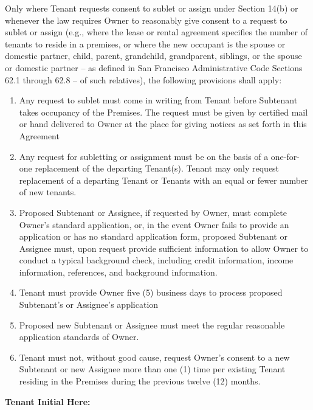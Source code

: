 \documentclass[9pt, letterpaper, oneside]{extarticle}
\begin{document}
\begin{enumerate}
Only where Tenant requests consent to sublet or assign under Section 14(b) or whenever the law requires Owner to reasonably give consent to a request to sublet or assign (e.g., where the lease or rental agreement specifies the number of tenants to reside in a premises, or where the new occupant is the spouse or domestic partner, child, parent, grandchild, grandparent, siblings, or the spouse or domestic partner -- as defined in San Francisco Administrative Code Sections 62.1 through 62.8 -- of such relatives), the following provisions shall apply:
    \begin{enumerate}
     \item Any request to sublet must come in writing from Tenant before Subtenant takes occupancy of the Premises. The request must be given by certified mail or hand delivered to Owner at the place for giving notices as set forth in this Agreement
     \item Any request for subletting or assignment must be on the basis of a one-for-one replacement of the departing Tenant(s). Tenant may only request replacement of a departing Tenant or Tenants with an equal or fewer number of new tenants.
     \item Proposed Subtenant or Assignee, if requested by Owner, must complete Owner's standard application, or, in the event Owner fails to provide an application or has no standard application form, proposed Subtenant or Assignee must, upon request provide sufficient information to allow Owner to conduct a typical background check, including credit information, income information, references, and background information.
     \item Tenant must provide Owner five (5) business days to process proposed Subtenant's or Assignee's application
     \item Proposed new Subtenant or Assignee must meet the regular reasonable application standards of Owner.
     \item Tenant must not, without good cause, request Owner's consent to a new Subtenant or new Assignee more than one (1) time per existing Tenant residing in the Premises during the previous twelve (12) months.
     \end{enumerate}

\vspace{5mm}\textbf{Tenant Initial Here: \underline{\hspace{3cm}}}
   \end{enumerate}
\end{document}
